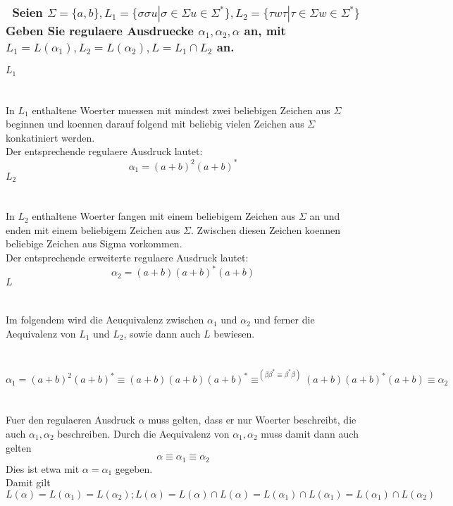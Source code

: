 \documentclass{article}
\newcommand{\gap}{\null\ \\ \\}
\newcommand{\task}[1]{\textbf{#1} \\ \gap}
\begin{document}
\subsubsection{\
    Seien $\Sigma = \{a,b\} 
        , L_1 = \{\sigma\sigma u | \sigma \in \Sigma u \in \Sigma^*\}
        , L_2 = \{\tau w \tau | \tau \in \Sigma w \in \Sigma^*\}$\\
    Geben Sie regulaere Ausdruecke $\alpha_1,\alpha_2,\alpha$ an, mit
        $L_1 = L(\alpha_1), L_2 = L(\alpha_2), L = L_1 \cap L_2$ an.
    }
\task{$L_1$}
In $L_1$ enthaltene Woerter muessen mit mindest zwei beliebigen Zeichen aus 
    $\Sigma$ beginnen und koennen darauf folgend mit beliebig vielen
    Zeichen aus $\Sigma$ konkatiniert werden.\\
Der entsprechende regulaere Ausdruck lautet:\[
    \alpha_1 = (a+b)^2 (a+b)^*
    \]
\task{$L_2$}
In $L_2$ enthaltene Woerter fangen mit einem beliebigem Zeichen aus $\Sigma$ an
    und enden mit einem beliebigem Zeichen aus $\Sigma$. Zwischen diesen Zeichen
    koennen beliebige Zeichen aus Sigma vorkommen.\\
Der entsprechende erweiterte regulaere Ausdruck lautet:\[
    \alpha_2 = (a+b)(a+b)^*(a+b)
    \]
\task{$L$}
Im folgendem wird die Aeuquivalenz zwischen $\alpha_1$ und $\alpha_2$ und ferner
    die Aequivalenz von $L_1$ und $L_2$, sowie dann auch $L$ bewiesen.\\
\gap
\[
    \alpha_1 = (a+b)^2(a+b)^*
        \equiv (a+b)(a+b)(a+b)^*
        \equiv^{(\beta \beta^* \equiv \beta^* \beta)} 
            (a+b)(a+b)^*(a+b)
        \equiv \alpha_2
    \]
\gap
Fuer den regulaeren Ausdruck $\alpha$ muss gelten, dass er nur Woerter
    beschreibt, die auch $\alpha_1,\alpha_2$ beschreiben. Durch die Aequivalenz
    von $\alpha_1,\alpha_2$ muss damit dann auch gelten\[
    \alpha \equiv \alpha_1 \equiv \alpha_2
    \]
Dies ist etwa mit $\alpha = \alpha_1$ gegeben.\\
Damit gilt \[
    L(\alpha) = L(\alpha_1) = L(\alpha_2);
    L(\alpha )= L(\alpha) \cap L(\alpha)
        = L(\alpha_1) \cap L(\alpha_1)
        = L(\alpha_1) \cap L(\alpha_2) 
    \]
\end{document}
